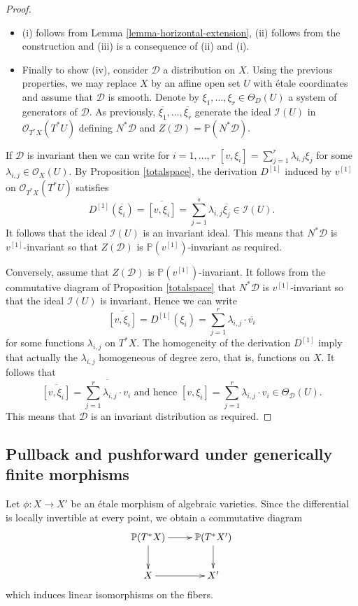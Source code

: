 \documentclass[12pt]{amsart}
\renewcommand{\P}{\mathbb{P}}
\theoremstyle{definition}
\theoremstyle{plain}
\theoremstyle{exampstyle}
\theoremstyle{exampstyle}\newtheorem{thmxbis}{Theorem}
\numberwithin{equation}{section}
\theoremstyle{remark}
\begin{document}
\begin{proof}
\begin{itemize}
\item (i) follows from Lemma \ref{lemma-horizontal-extension}, (ii) follows from the construction and (iii) is a consequence of (ii) and (i). 

\item Finally to show (iv), consider $\mathcal D$ a distribution on $X$. Using the previous properties, we may replace $X$ by an affine open set $U$ with étale coordinates  and assume that $\mathcal D$ is smooth. Denote by $\xi_1,\ldots,\xi_r \in \Theta_D(U)$ a system of generators of $\mathcal D$. As previously, $\overline{\xi_1},\ldots, \overline{\xi_r}$ generate the ideal $\mathcal I(U)$ in $\mathcal O_{T^\ast X}(T^\ast U)$ defining $N^\ast \mathcal D$ and $Z(\mathcal D) = \mathbb{P}(N^\ast \mathcal D)$. 
\end{itemize}
If $\mathcal D$ is invariant then we can write for $i = 1,\ldots, r$
$[v,\xi_i] = \sum_{j = 1}^r \lambda_{i,j} \xi_j$ for some $\lambda_{i,j} \in \mathcal O_X(U)$. 
By Proposition \ref{totalspace}, the derivation $D^{[1]}$ induced by $v^{[1]}$ on $\mathcal O_{T^\ast X}(T^\ast U)$ satisfies 
$$D^{[1]}(\overline{\xi_i}) = \overline{[v,\xi_i]} = \sum_{j = 1}^s \lambda_{i,j} \overline{\xi_j} \in \mathcal I(U).$$ 
It follows that the ideal $\mathcal I(U)$ is an invariant ideal. This means that $N^\ast \mathcal D$ is $v^{[1]}$-invariant so that $Z(\mathcal D)$ is $\mathbb{P}(v^{[1]})$-invariant as required. 

Conversely,  assume that $Z(\mathcal D)$ is $\P(v^{[1]})$-invariant.  It follows from the commutative diagram of Proposition \ref{totalspace} that $N^\ast \mathcal D$ is $v^{[1]}$-invariant so that the ideal $\mathcal I(U)$ is invariant. Hence we can write
$$\overline{[v,\xi_i]} = D^{[1]}(\xi_i) = \sum_{j = 1}^r \lambda_{i,j} \cdot \overline{v_i}$$ 
for some functions $\lambda_{i,j}$ on $T^\ast X$. The homogeneity of the derivation $D^{[1]}$ imply that actually the $\lambda_{i,j}$ homogeneous of degree zero, that is, functions on $X$. It follows that 
$$ \overline{[v,\xi_i]} = \overline{\sum_{j = 1}^r \lambda_{i,j} \cdot v_i} \text{ and hence } [v,\xi_i] = \sum_{j = 1}^r \lambda_{i,j} \cdot v_i \in \Theta_\mathcal D(U).$$
This means that $\mathcal D$ is an invariant distribution as required.
\end{proof} 

\subsection{Pullback and pushforward under generically finite morphisms} Let $\phi: X \rightarrow X'$ be an étale morphism of algebraic varieties. Since the differential is locally invertible at every point, we obtain a commutative diagram 
$$ \xymatrix{ \P(T^\ast X) \ar[d] \ar[r] & \P(T^\ast X') \ar[d] \\ X \ar[r] & X'}$$
which induces linear isomorphisms on the fibers. 
\end{document}
